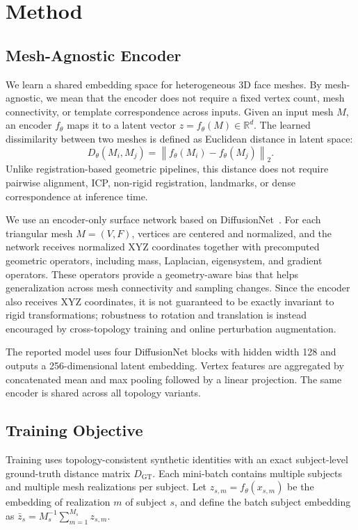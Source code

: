 \documentclass{article}
\begin{document}
\section{Method}
\label{sec:method}

\subsection{Mesh-Agnostic Encoder}
\label{sec:encoder}
We learn a shared embedding space for heterogeneous 3D face meshes. By mesh-agnostic, we mean that the encoder does not require a fixed vertex count, mesh connectivity, or template correspondence across inputs. Given an input mesh $M$, an encoder $f_\theta$ maps it to a latent vector $z=f_\theta(M)\in\mathbb{R}^d$. The learned dissimilarity between two meshes is defined as Euclidean distance in latent space:
\begin{equation}
D_{\theta}(M_i,M_j)
=
\left\|
f_{\theta}(M_i)-f_{\theta}(M_j)
\right\|_2 .
\end{equation}
Unlike registration-based geometric pipelines, this distance does not require pairwise alignment, ICP, non-rigid registration, landmarks, or dense correspondence at inference time.

We use an encoder-only surface network based on DiffusionNet~\cite{diffusionet}. 
For each triangular mesh $M=(V,F)$, vertices are centered and normalized, and the network receives normalized XYZ coordinates together with precomputed geometric operators, including mass, Laplacian, eigensystem, and gradient operators. These operators provide a geometry-aware bias that helps generalization across mesh connectivity and sampling changes. Since the encoder also receives XYZ coordinates, it is not guaranteed to be exactly invariant to rigid transformations; robustness to rotation and translation is instead encouraged by cross-topology training and online perturbation augmentation.

The reported model uses four DiffusionNet blocks with hidden width 128 and outputs a 256-dimensional latent embedding. Vertex features are aggregated by concatenated mean and max pooling followed by a linear projection. The same encoder is shared across all topology variants.
\subsection{Training Objective}
\label{sec:training_objective}

Training uses topology-consistent synthetic identities with an exact subject-level
ground-truth distance matrix $D_{\mathrm{GT}}$. Each mini-batch contains multiple
subjects and multiple mesh realizations per subject. Let
$z_{s,m}=f_\theta(x_{s,m})$ be the embedding of realization $m$ of subject $s$,
and define the batch subject embedding as
$\bar z_s = M_s^{-1}\sum_{m=1}^{M_s} z_{s,m}$.
\end{document}
